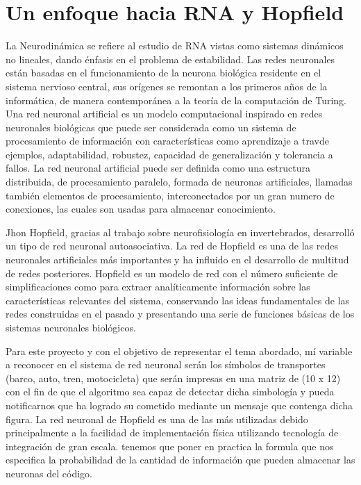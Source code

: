 \documentclass{report}
\begin{document}
\section{Un enfoque hacia RNA y Hopfield}
{\large La Neurodin\'amica se refiere al estudio de RNA vistas como sistemas dinámicos no lineales, dando \'enfasis en el problema de estabilidad. Las redes neuronales están basadas en el funcionamiento de la neurona biol\'ogica residente en el sistema nervioso central, sus or\'igenes se remontan a los primeros años de la inform\'atica, de manera contempor\'anea a la teor\'ia de la computaci\'on de Turing. Una red neuronal artificial es un modelo computacional inspirado en redes neuronales biol\'ogicas que puede ser considerada como un sistema de procesamiento de informaci\'on con caracter\'isticas como aprendizaje a trav de ejemplos, adaptabilidad, robustez, capacidad de generalizaci\'on y tolerancia a fallos. La red neuronal artificial puede ser definida como una estructura distribuida, de procesamiento paralelo, formada de neuronas artificiales, llamadas tambi\'en elementos de procesamiento, interconectados por un gran numero de conexiones, las cuales son usadas para almacenar conocimiento.

Jhon Hopfield, gracias al trabajo sobre neurofisiolog\'ia en invertebrados, desarroll\'o un tipo de red neuronal autoasociativa. La red de Hopfield es una de las redes neuronales artificiales m\'as importantes y ha influido en el desarrollo de multitud de redes posteriores. Hopfield es un modelo de red con el n\'umero suficiente de simplificaciones como para extraer anal\'iticamente informaci\'on sobre las caracter\'isticas relevantes del sistema, conservando las ideas fundamentales de las redes construidas en el pasado y presentando una serie de funciones b\'asicas de los sistemas neuronales biol\'ogicos.


Para este proyecto y con el objetivo de representar el tema abordado, m\'i variable a reconocer en el sistema de red neuronal ser\'an los s\'imbolos de transportes (barco, auto, tren, motocicleta) que ser\'an impresas en una matriz de (10 x 12) con el fin de que el algoritmo sea capaz de detectar dicha simbolog\'ia y pueda notificarnos que ha logrado su cometido mediante un mensaje que contenga dicha figura. La red neuronal de Hopfield es una de las más utilizadas debido principalmente a la facilidad de implementaci\'on f\'isica utilizando tecnolog\'ia de integraci\'on de gran escala. tenemos que poner en practica la formula que nos especifica la probabilidad de la cantidad de informaci\'on que pueden almacenar las neuronas del código.} 
\end{document}
